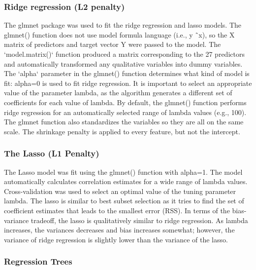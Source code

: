 \documentclass[sigconf]{acmart}
\begin{document}

\subsubsection{Ridge regression (L2 penalty)} 

The glmnet package was used to fit the ridge regression and lasso models. 
The glmnet() function does not use model formula language (i.e., y \~\ x), 
so the X matrix of predictors and target vector Y were passed to the model. 
The `model.matrix()` function produced a matrix corresponding to the 27 
predictors and automatically transformed any qualitative variables into
dummy variables. The `alpha` parameter in the glmnet() function determines 
what kind of model is fit: alpha=0 is used to fit ridge regression. It is
important to select an appropriate value of the parameter lambda, as the
algorithm generates a different set of coefficients for each value of 
lambda. By default, the glmnet() function performs ridge regression for an 
automatically selected range of lambda values (e.g., 100). The glmnet 
function also standardizes the variables so they are all on the same scale.
The shrinkage penalty is applied to every feature, but not the intercept. 


\subsubsection{The Lasso (L1 Penalty)} 
 
The Lasso model was fit using the glmnet() function with alpha=1. The model 
automatically calculates correlation estimates for a wide range of lambda 
values. Cross-validation was used to select an optimal value of the tuning 
parameter lambda. The lasso is similar to best subset selection as it tries 
to find the set of coefficient estimates that leads to the smallest error (RSS). 
In terms of the bias-variance tradeoff, the lasso is qualitatively similar to 
ridge regression. As lambda increases, the variances decreases and bias 
increases somewhat; however, the variance of ridge regression is slightly 
lower than the variance of the lasso. 
 

\subsubsection{Regression Trees} 
\end{document}
